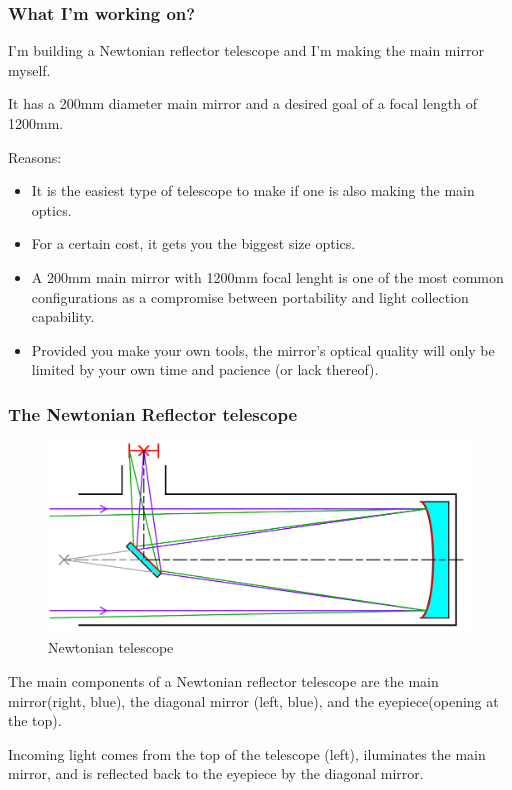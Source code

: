 \documentclass{beamer}
\begin{document}
\begin{frame}
\frametitle{What I'm working on?}
I'm building a Newtonian reflector telescope and I'm making the main mirror myself.

It has a 200mm diameter main mirror and a desired goal of a focal length of 1200mm.

Reasons:
\begin{itemize}
\item It is the easiest type of telescope to make if one is also making the main optics.
\item For a certain cost, it gets you the biggest size optics.
\item A 200mm main mirror with 1200mm focal lenght is one of the most common configurations as a compromise between portability and light collection capability.
\item Provided you make your own tools, the mirror's optical quality will only be limited by your own time and pacience (or lack thereof).
\end{itemize}
\end{frame}

\begin{frame}
\frametitle{The Newtonian Reflector telescope}
\begin{figure}
\includegraphics[scale=0.3]{assets/Newtonian_telescope2.pdf}
\caption{Newtonian telescope}
\end{figure}
The main components of a Newtonian reflector telescope are the main mirror\footnotemark (right, blue),
the diagonal mirror (left, blue), and the eyepiece\footnotemark (opening at the top).

Incoming light comes from the top of the telescope (left), iluminates the main mirror, and is reflected back to the eyepiece by the diagonal mirror.
\end{frame}
\end{document}
